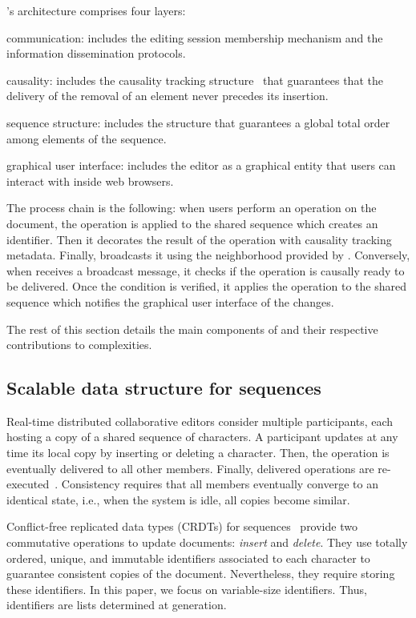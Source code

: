 \CRATE's architecture comprises four layers:
\begin{inparaenum}[(i)]
\item communication: includes the editing session membership mechanism and the
  information dissemination protocols.
\item causality: includes the causality tracking
  structure~\cite{malkhi2007concise} that guarantees that the delivery of the
  removal of an element never precedes its insertion.
\item sequence structure: includes the structure that guarantees a global
  total order among elements of the sequence.
\item graphical user interface: includes the editor as a graphical entity that
  users can interact with inside web browsers.
\end{inparaenum}
The process chain is the following: when users perform an operation on the
document, the operation is applied to the shared sequence which creates an \LSEQ
identifier. Then it decorates the result of the operation with causality
tracking metadata. Finally, \CRATE broadcasts it using the neighborhood provided
by \SPRAY.  Conversely, when \CRATE receives a broadcast message, it checks if
the operation is causally ready to be delivered. Once the condition is verified,
it applies the operation to the shared sequence which notifies the graphical
user interface of the changes.

The rest of this section details the main components of \CRATE and their
respective contributions to complexities.

\subsection{Scalable data structure for sequences}

Real-time distributed collaborative editors consider multiple participants, each
hosting a copy of a shared sequence of characters. A participant updates at any
time its local copy by inserting or deleting a character. Then, the operation is
eventually delivered to all other members. Finally, delivered operations are
re-executed~\cite{saito2005optimistic}. Consistency requires that all members
eventually converge to an identical state, i.e., when the system is idle, all
copies become similar.

Conflict-free replicated data types (CRDTs) for
sequences~\cite{shapiro2011conflict, shapiro2011comprehensive} provide two
commutative operations to update documents: \emph{insert} and \emph{delete}.
They use totally ordered, unique, and immutable identifiers associated to each
character to guarantee consistent copies of the document. Nevertheless, they
require storing these identifiers. In this paper, we focus on variable-size
identifiers. Thus, identifiers are lists determined at generation.


